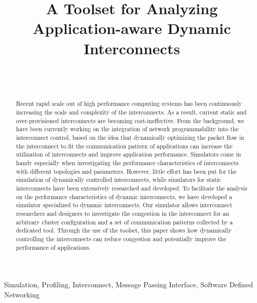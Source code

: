 \documentclass[conference]{IEEEtran}
\begin{document}
\title{A Toolset for Analyzing Application-aware Dynamic Interconnects}

\author{%
     \\
     \\
}

\maketitle

\begin{abstract}
    Recent rapid scale out of high performance computing systems has
    been continuously increasing the scale and complexity of the
    interconnects. As a result, current static and over-provisioned
    interconnects are becoming cost-ineffective. From the background, we have
    been currently working on the integration of network programmability into
    the interconnect control, based on the idea that dynamically optimizing
    the packet flow in the interconnect to fit the communication pattern of
    applications can increase the utilization of interconnects and improve
    application performance. Simulators come in handy especially when
    investigating the performance characteristics of interconnects with
    different topologies and parameters. However, little effort has been put
    for the simulation of dynamically controlled interconnects, while
    simulators for static interconnects have been extensively researched and
    developed. To facilitate the analysis on the performance characteristics
    of dynamic interconnects, we have developed a simulator specialized to
    dynamic interconnects. Our simulator allows interconnect researchers and
    designers to investigate the congestion in the interconnect for an
    arbitrary cluster configuration and a set of communication patterns
    collected by a dedicated tool. Through the use of the toolset, this paper
    shows how dynamically controlling the interconnects can reduce congestion
    and potentially improve the performance of applications.
\end{abstract}

\begin{IEEEkeywords}
    Simulation, Profiling, Interconnect, Message Passing Interface, Software
    Defined Networking
\end{IEEEkeywords}
\end{document}
